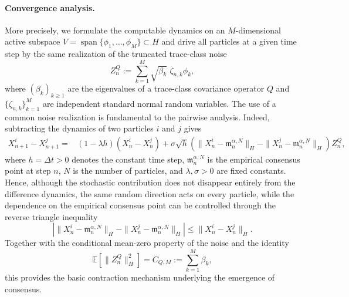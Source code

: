 \documentclass[12pt]{amsart}
\numberwithin{equation}{section}
\begin{document}
\paragraph{\textbf{Convergence analysis.}}
More precisely, we formulate the computable dynamics on an $M$-dimensional active subspace $V=\operatorname{span}\{\phi_1,\ldots,\phi_M\}\subset H$ and drive all particles at a given time step by the same realization of the truncated trace-class noise
\begin{equation*}
    Z_n^Q := \sum_{k=1}^M \sqrt{\beta_k}\,\,\zeta_{n,k}\phi_k,
\end{equation*}
where $(\beta_k)_{k\geq 1}$ are the eigenvalues of a trace-class covariance operator $Q$ and $\{\zeta_{n,k}\}_{k=1}^M$ are independent standard normal random variables. The use of a common noise realization is fundamental to the pairwise analysis. Indeed, subtracting the dynamics of two particles $i$ and $j$ gives
\begin{equation*}
\begin{aligned}
    X_{n+1}^i-X_{n+1}^j ={}&(1-\lambda h)(X_n^i-X_n^j) +\sigma\sqrt{h}\left(\|X_n^i-\mathfrak{m}_n^{\alpha,N}\|_H-\|X_n^j-\mathfrak{m}_n^{\alpha,N}\|_H\right)Z_n^Q,
\end{aligned}
\end{equation*}
where $h = \Delta t > 0$ denotes the constant time step, $\mathfrak{m}_n^{\alpha,N}$ is the empirical consensus point at step $n$, $N$ is the number of particles, and $\lambda,\sigma>0$ are fixed constants. 
Hence, although the stochastic contribution does not disappear entirely from the difference dynamics, the same random direction acts on every particle, while the dependence on the empirical consensus point can be controlled through the reverse triangle inequality
\begin{equation*}
    \left|\|X_n^i-\mathfrak{m}_n^{\alpha,N}\|_H-\|X_n^j-\mathfrak{m}_n^{\alpha,N}\|_H\right| \leq \|X_n^i-X_n^j\|_H.
\end{equation*}
Together with the conditional mean-zero property of the noise and the identity
\begin{equation*}
    \mathbb{E}\left[\|Z_n^Q\|_H^2\right]=C_{Q,M}:=\sum_{k=1}^M\beta_k,
\end{equation*}
this provides the basic contraction mechanism underlying the emergence of consensus.
\end{document}
